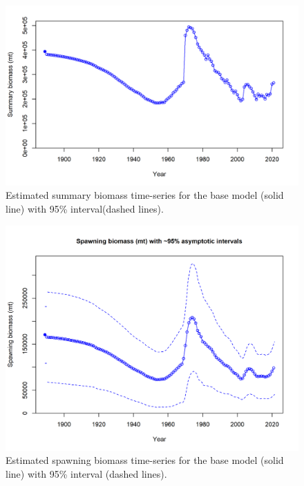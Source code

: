 \documentclass[11pt,
  english,
  a4paper,
]{article}
\begin{document}
\tagmcend\tagstructend


\begin{figure}
\centering
\includegraphics[width=1\textwidth,height=1\textheight]{figs/ts4_Summary_biomass_mt.png}
\caption{Estimated summary biomass time-series for the base model (solid line) with 95\% interval(dashed lines).\label{fig:ts1_4}}
\end{figure}

\tagmcend\tagstructend


\begin{figure}
\centering
\includegraphics[width=1\textwidth,height=1\textheight]{figs/ts7_Spawning_biomass_mt_with_95_asymptotic_intervals_intervals.png}
\caption{Estimated spawning biomass time-series for the base model (solid line) with 95\% interval (dashed lines).\label{fig:ts7}}
\end{figure}
\end{document}

